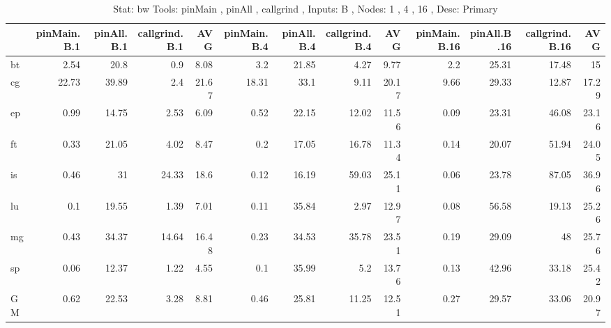 \begin{table}[]
\caption{Stat: bw 
 Tools: pinMain , pinAll , callgrind ,  
 Inputs: B ,  
 Nodes: 1 , 4 , 16 ,  
 Desc: Primary}
\begin{center}
\begin{tabular}{lrrrrrrrrrrrr}
\hline
    &   pinMain.B.1 &   pinAll.B.1 &   callgrind.B.1 &   AVG &   pinMain.B.4 &   pinAll.B.4 &   callgrind.B.4 &   AVG &   pinMain.B.16 &   pinAll.B.16 &   callgrind.B.16 &   AVG \\
\hline
 bt &          2.54 &         20.8 &             0.9 &  8.08 &           3.2 &        21.85 &            4.27 &  9.77 &            2.2 &         25.31 &            17.48 &    15 \\
 cg &         22.73 &        39.89 &             2.4 & 21.67 &         18.31 &         33.1 &            9.11 & 20.17 &           9.66 &         29.33 &            12.87 & 17.29 \\
 ep &          0.99 &        14.75 &            2.53 &  6.09 &          0.52 &        22.15 &           12.02 & 11.56 &           0.09 &         23.31 &            46.08 & 23.16 \\
 ft &          0.33 &        21.05 &            4.02 &  8.47 &           0.2 &        17.05 &           16.78 & 11.34 &           0.14 &         20.07 &            51.94 & 24.05 \\
 is &          0.46 &           31 &           24.33 &  18.6 &          0.12 &        16.19 &           59.03 & 25.11 &           0.06 &         23.78 &            87.05 & 36.96 \\
 lu &           0.1 &        19.55 &            1.39 &  7.01 &          0.11 &        35.84 &            2.97 & 12.97 &           0.08 &         56.58 &            19.13 & 25.26 \\
 mg &          0.43 &        34.37 &           14.64 & 16.48 &          0.23 &        34.53 &           35.78 & 23.51 &           0.19 &         29.09 &               48 & 25.76 \\
 sp &          0.06 &        12.37 &            1.22 &  4.55 &           0.1 &        35.99 &             5.2 & 13.76 &           0.13 &         42.96 &            33.18 & 25.42 \\
 GM &          0.62 &        22.53 &            3.28 &  8.81 &          0.46 &        25.81 &           11.25 & 12.51 &           0.27 &         29.57 &            33.06 & 20.97 \\
\hline
\end{tabular}
\end{center}
\end{table}
